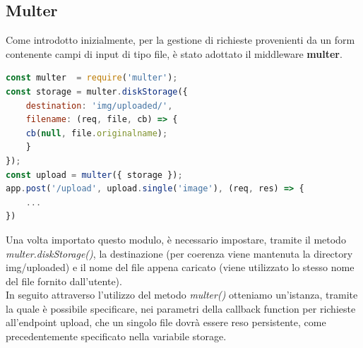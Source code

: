 \subsection{Multer}
Come introdotto inizialmente, per la gestione di richieste provenienti da un form contenente campi di input di tipo file, è stato adottato il middleware \textbf{multer}.
\begin{lstlisting}[language=Javascript, caption={Configurazione upload immagine}, showstringspaces=false]
const multer  = require('multer');
const storage = multer.diskStorage({
    destination: 'img/uploaded/',
    filename: (req, file, cb) => {
    cb(null, file.originalname);
    }
});
const upload = multer({ storage });
app.post('/upload', upload.single('image'), (req, res) => {
    ...
})
\end{lstlisting}
Una volta importato questo modulo, è necessario impostare, tramite il metodo \emph{multer.diskStorage()}, la destinazione (per coerenza viene mantenuta la directory img/uploaded) e il nome del file appena caricato (viene utilizzato lo stesso nome del file fornito dall'utente).
\\In seguito attraverso l'utilizzo del metodo \emph{multer()} otteniamo un'istanza, tramite la quale è possibile specificare, nei parametri della callback function per richieste all'endpoint upload, che un singolo file dovrà essere reso persistente, come precedentemente specificato nella variabile storage.
